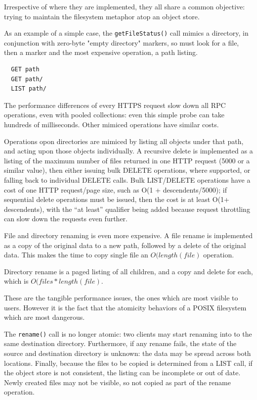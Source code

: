 \documentclass[conference]{IEEEtran}
\begin{document}
Irrespective of where they are implemented, they all share a common objective:
trying to maintain the filesystem metaphor atop an object store.

As an example of a simple case, the \texttt{getFileStatus()} call mimics
a directory, in conjunction with zero-byte "empty directory" markers,
so must look for a file, then a marker and the most expensive operation, a path listing.

\begin{verbatim}
  GET path
  GET path/
  LIST path/
\end{verbatim}

The performance differences of every HTTPS request slow
down all RPC operations, even with pooled collections: even this simple probe
can take hundreds of milliseconds.
Other mimiced operations have similar costs.

Operations opon directories are mimiced by listing all objects under that path,
and acting upon those objects individually.
A recursive delete is implemented as a listing of the maximum number of files
returned in one HTTP request (5000 or a similar value), then either issuing
bulk DELETE operations, where supported, or falling back to individual DELETE
calls.
Bulk LIST/DELETE operations have a cost of one HTTP request/page size, such
as O(1 + descendents/5000); if sequential delete operations must be issued, then
the cost is at least O(1+ descendents), with the ``at least'' qualifier being
added because request throttling can slow down the requests even further.

File and directory renaming is even more expensive.
A file rename is implemented as a copy of the original data to a new path,
followed by a delete of the original data.
This makes the time to copy single file an $O(length(file)$ operation.

Directory rename is a paged listing of all children, and a copy and delete for
each, which is $O(files *length(file)$.

These are the tangible performance issues, the ones which are most visible
to users.
However it is the fact that the atomicity behaviors of a POSIX filesystem
which are most dangerous.

The \texttt{rename()} call is no longer atomic: two clients may start renaming
into to the same destination directory.
Furthermore, if any rename fails, the state of the source and destination
directory is unknown: the data may be spread across both locations.
Finally, because the files to be copied is determined from a LIST call,
if the object store is not consistent, the listing can be incomplete or out of
date.
Newly created files may not be visible, so not copied as part of the rename
operation.
\end{document}
